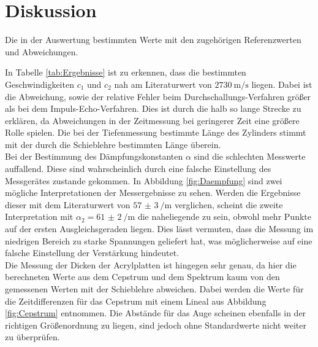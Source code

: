 
\section{Diskussion}
\label{sec:Diskussion}

\begin{table}
	\centering
	\caption{Die in der Auswertung bestimmten Werte mit den zugehörigen Referenzwerten und Abweichungen.}
	
	\label{tab:Ergebnisse}
\end{table}

\noindent In Tabelle \ref{tab:Ergebnisse} ist zu erkennen, dass die bestimmten Geschwindigkeiten $c_1$ und $c_2$ nah am Literaturwert von $\SI{2730}{\metre\per\second}$ liegen. Dabei ist die Abweichung, sowie der relative Fehler beim Durchschallungs-Verfahren größer als bei dem Impuls-Echo-Verfahren. Dies ist durch die halb so lange Strecke zu erklären, da Abweichungen in der Zeitmessung bei geringerer Zeit eine größere Rolle spielen. Die bei der Tiefenmessung bestimmte Länge des Zylinders stimmt mit der durch die Schieblehre bestimmten Länge überein.\\
Bei der Bestimmung des Dämpfungskonstanten $\alpha$ sind die schlechten Messwerte auffallend. Diese sind wahrscheinlich durch eine falsche Einstellung des Messgerätes zustande gekommen. In Abbildung \ref{fig:Daempfung} sind zwei mögliche Interpretationen der Messergebnisse zu sehen. Werden die Ergebnisse dieser mit dem Literaturwert von $\SI{57(3)}{\per\metre}$ verglichen, scheint die zweite Interpretation mit $\alpha_2=\SI{61(2)}{\per\metre}$ die naheliegende zu sein, obwohl mehr Punkte auf der ersten Ausgleichsgeraden liegen. Dies lässt vermuten, dass die Messung im niedrigen Bereich zu starke Spannungen geliefert hat, was möglicherweise auf eine falsche Einstellung der Verstärkung hindeutet.\\
Die Messung der Dicken der Acrylplatten ist hingegen sehr genau, da hier die berechneten Werte aus dem Cepstrum und dem Spektrum kaum von den gemessenen Werten mit der Schieblehre abweichen. Dabei werden die Werte für die Zeitdifferenzen für das Cepstrum mit einem Lineal aus Abbildung \ref{fig:Cepstrum} entnommen. Die Abstände für das Auge scheinen ebenfalls in der richtigen Größenordnung zu liegen, sind jedoch ohne Standardwerte nicht weiter zu überprüfen.     